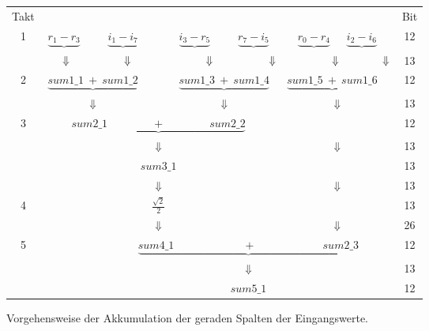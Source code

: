\begin{figure}[htbp]
\begin{tabular}{ccccccccccccc}
Takt&\multicolumn{11}{c}{}&Bit\\
1 &$\underbrace{r_1 - r_3}$ &        &$ \underbrace{i_1 - i_7}$ &  &$\underbrace{i_3 - r_5}$ &  &$\underbrace{r_7 - i_5}$ &  &$\underbrace{r_0 - r_4}$ &$\underbrace{i_2 - i_6}$& &12\\
  &\multicolumn{11}{l}{$\hspace{0.5cm} \Downarrow \hspace{1.75cm} \Downarrow \hspace{2.4cm} \Downarrow \hspace{1.8cm}\Downarrow \hspace{1.8cm}\Downarrow \hspace{1.4cm}\Downarrow$}&13\\
2 &\multicolumn{3}{c}{$\underbrace{sum1\_1 \: + \: sum1\_2}$} & & \multicolumn{3}{c}{$\underbrace{sum1\_3 \: + \: sum1\_4}$} &\multicolumn{3}{c}{$\: \underbrace{sum1\_5 \: + \: sum1\_6}$}& &12\\
  &\multicolumn{3}{c}{$\Downarrow$}  & & \multicolumn{3}{c}{$\Downarrow$} & & \multicolumn{2}{c}{$\Downarrow$}& &13\\
3 &\multicolumn{7}{c}{$\underbrace{sum2\_1 \quad  \quad \quad \quad + \quad \quad \quad  \quad sum2\_2}$} & & & & &12\\
  &\multicolumn{7}{c}{$\Downarrow$}& & \multicolumn{2}{c}{$\Downarrow$}& &13\\
  &\multicolumn{7}{c}{$sum3\_1$}& & & & &13\\
  & & & & $\Downarrow$& & & & & \multicolumn{2}{c}{$\Downarrow$} & & 13\\
4 & & & & $\frac{\sqrt{2}}{2}$&\multicolumn{5}{c}{}& & &13\\
  & & & & $\Downarrow$& & & & & \multicolumn{2}{c}{$\Downarrow$ }& & 26\\
5 & & & \multicolumn{9}{c}{$\underbrace{sum4\_1 \:  \quad \quad \quad \quad \quad \quad + \quad \quad \quad \quad \quad \quad   sum2\_3}$} &12\\
  & & & \multicolumn{9}{c}{$\Downarrow$}&13\\
  & & & \multicolumn{9}{c}{$sum5\_1$}&12\\
\end{tabular}
\caption{Vorgehensweise der Akkumulation der geraden Spalten der Eingangswerte.}
\label{pic:AkkumulationGeradeSpalten}
\end{figure}



